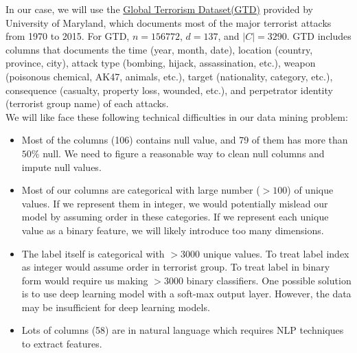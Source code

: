 \documentclass{article}
\begin{document}
\noindent In our case, we will use the \href{https://www.start.umd.edu/gtd/}{Global Terrorism Dataset(GTD)} provided by University of Maryland, which documents most of the major terrorist attacks from 1970 to 2015. For GTD, $n = 156772$, $d = 137$, and $|C|=3290$. GTD includes columns that documents the time (year, month, date), location (country, province, city), attack type (bombing, hijack, assassination, etc.), weapon (poisonous chemical, AK47, animals, etc.), target (nationality, category, etc.), consequence (casualty, property loss, wounded, etc.), and perpetrator identity (terrorist group name) of each attacks.\\

\noindent We will like face these following technical difficulties in our data mining problem:\\
\begin{itemize}
\item Most of the columns (106) contains null value, and 79 of them has more than $50\%$ null. We need to figure a reasonable way to clean null columns and impute null values.
\item Most of our columns are categorical with large number ($ > 100$) of unique values. If we represent them in integer, we would potentially mislead our model by assuming order in these categories. If we represent each unique value as a binary feature, we will likely introduce too many dimensions.
\item The label itself is categorical with $>3000$ unique values. To treat label index as integer would assume order in terrorist group. To treat label in binary form would require us making $>3000$ binary classifiers. One possible solution is to use deep learning model with a soft-max output layer. However, the data may be insufficient for deep learning models. 
\item Lots of columns (58) are in natural language which requires NLP techniques to extract features.
\end{itemize} 
\end{document}
